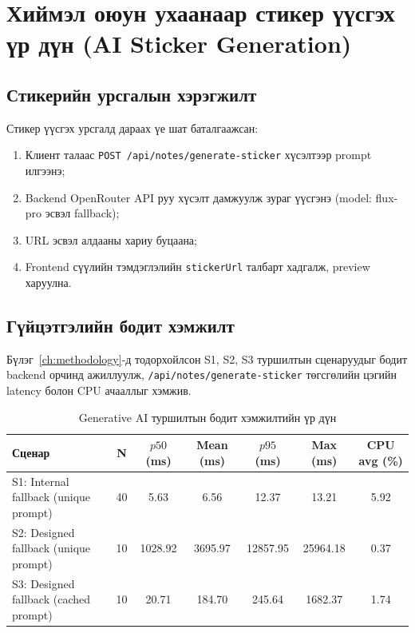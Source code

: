 \section{Хиймэл оюун ухаанаар стикер үүсгэх үр дүн (AI Sticker Generation)}
\label{sec:ai_sticker_results}

\subsection{Стикерийн урсгалын хэрэгжилт}
\label{subsec:sticker_flow_result}

Стикер үүсгэх урсгалд дараах үе шат баталгаажсан:

\begin{enumerate}
    \item Клиент талаас \texttt{POST /api/notes/generate-sticker} хүсэлтээр prompt илгээнэ;
    \item Backend OpenRouter API руу хүсэлт дамжуулж зураг үүсгэнэ (model: flux-pro эсвэл fallback);
    \item URL эсвэл алдааны хариу буцаана;
    \item Frontend сүүлийн тэмдэглэлийн \texttt{stickerUrl} талбарт хадгалж, preview харуулна.
\end{enumerate}

\subsection{Гүйцэтгэлийн бодит хэмжилт}
\label{subsec:genai_perf_result}

Бүлэг~\ref{ch:methodology}-д тодорхойлсон S1, S2, S3 туршилтын сценаруудыг бодит backend орчинд ажиллуулж, \texttt{/api/notes/generate-sticker} төгсгөлийн цэгийн latency болон CPU ачааллыг хэмжив.

\begin{table}[H]
\centering
\small
\caption{Generative AI туршилтын бодит хэмжилтийн үр дүн}
\label{tab:genai_perf_results}
\begin{tabular}{>{\raggedright\arraybackslash}p{3.5cm}cccccc}
\toprule
\textbf{Сценар} & \textbf{N} & \textbf{$p50$ (ms)} & \textbf{Mean (ms)} & \textbf{$p95$ (ms)} & \textbf{Max (ms)} & \textbf{CPU avg (\%)} \\
\midrule
S1: Internal fallback (unique prompt) & 40 & 5.63 & 6.56 & 12.37 & 13.21 & 5.92 \\
S2: Designed fallback (unique prompt) & 10 & 1028.92 & 3695.97 & 12857.95 & 25964.18 & 0.37 \\
S3: Designed fallback (cached prompt) & 10 & 20.71 & 184.70 & 245.64 & 1682.37 & 1.74 \\
\bottomrule
\end{tabular}
\normalsize
\end{table}

